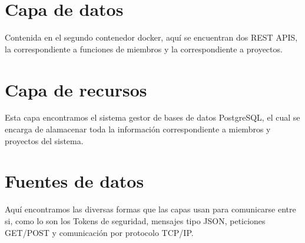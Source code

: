 \documentclass[12pt]{article}
\begin{document}
\section{Capa de datos}
Contenida en el segundo contenedor docker, aquí se encuentran dos REST APIS, la correspondiente a funciones de miembros y la correspondiente a proyectos.\newline\newline

\section{Capa de recursos}
Esta capa encontramos el sistema gestor de bases de datos PostgreSQL, el cual se encarga de alamacenar toda la información correspondiente a miembros y proyectos del sistema.\newline\newline

\section{Fuentes de datos}
Aquí encontramos las diversas formas que las capas usan para comunicarse entre si, como lo son los Tokens de seguridad, mensajes tipo JSON, peticiones GET/POST y comunicación por protocolo TCP/IP.\newline\newline
\end{document}
